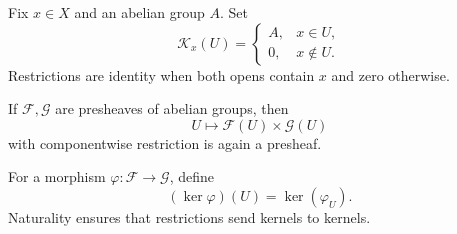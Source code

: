 \begin{example}
Fix $x\in X$ and an abelian group $A$.  Set
\[
\mathcal K_x(U)=
\begin{cases}
A,&x\in U,\\
0,&x\notin U.
\end{cases}
\]
Restrictions are identity when both opens contain $x$ and zero otherwise.
\end{example}

\begin{example}
If $\mathcal F,\mathcal G$ are presheaves of abelian groups, then
\[
U\longmapsto\mathcal F(U)\times\mathcal G(U)
\]
with componentwise restriction is again a presheaf.
\end{example}

\begin{example}
For a morphism $\varphi:\mathcal F\to\mathcal G$, define
\[
(\ker\varphi)(U)=\ker(\varphi_U).
\]
Naturality ensures that restrictions send kernels to kernels.
\end{example}
